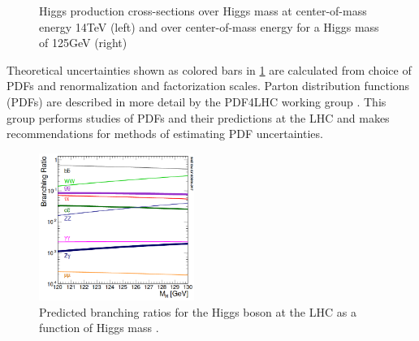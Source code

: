 \begin{figure}[H]
    \centering
    \qquad
    \caption{Higgs production cross-sections over Higgs mass at center-of-mass energy 14TeV (left) and over center-of-mass energy for a Higgs mass of 125GeV  (right)\cite{LHCCrossSectionWG}}%
    \label{fig:HiggsCrosssection}%
\end{figure}

Theoretical uncertainties shown as colored bars in \ref{fig:HiggsCrosssection} are calculated from choice of PDFs and renormalization and factorization scales. Parton distribution functions (PDFs) are described in more detail by the PDF4LHC working group \cite{PDF4LHC}. This group performs studies of PDFs and their predictions at the LHC and makes recommendations for methods of estimating PDF uncertainties. 

\begin{figure}[H]
        \centering
    \includegraphics[width=0.45\textwidth] {Pictures/HiggsBranching.png}\hspace{1cm}
    \caption{Predicted branching ratios for the Higgs boson at the LHC as a function of Higgs mass \cite{LHCCrossSectionWG}.}
    \label{fig:HiggsBR}
\end{figure}

